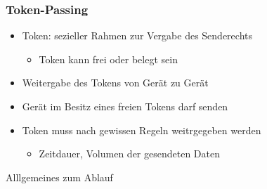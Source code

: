     \subsubsection{Token-Passing}
      \begin{itemize}
        \item Token: sezieller Rahmen zur Vergabe des Senderechts
          \begin{itemize}
            \item Token kann frei oder belegt sein
          \end{itemize}
        \item Weitergabe des Tokens von Gerät zu Gerät
        \item Gerät im Besitz eines freien Tokens darf senden
        \item Token muss nach gewissen Regeln weitrgegeben werden
          \begin{itemize}
            \item Zeitdauer, Volumen der gesendeten Daten
          \end{itemize}
      \end{itemize}
      Alllgemeines zum Ablauf
